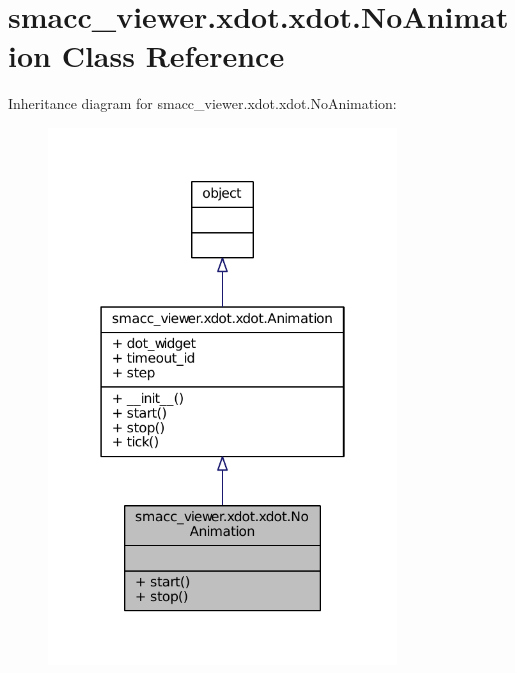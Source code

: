 \hypertarget{classsmacc__viewer_1_1xdot_1_1xdot_1_1NoAnimation}{}\section{smacc\+\_\+viewer.\+xdot.\+xdot.\+No\+Animation Class Reference}
\label{classsmacc__viewer_1_1xdot_1_1xdot_1_1NoAnimation}


Inheritance diagram for smacc\+\_\+viewer.\+xdot.\+xdot.\+No\+Animation\+:
\nopagebreak
\begin{figure}[H]
\begin{center}
\leavevmode
\includegraphics[width=262pt]{classsmacc__viewer_1_1xdot_1_1xdot_1_1NoAnimation__inherit__graph}
\end{center}
\end{figure}


